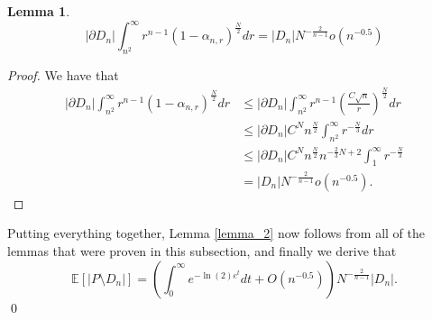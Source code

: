 \documentclass[10pt, twoside, leqno]{article}
\newtheorem{lemma}[thm]{Lemma}
\theoremstyle{definition}
\numberwithin{equation}{section}
\newcommand{\E}{{\mathbb{E}}}
\newcommand{\NN}{N^{-\frac 2{n-1} }}
\begin{document}
\begin{lemma}\label{3.9}
\[
|\partial D_{n}|\int_{n^{2}}^{\infty}r^{n-1}\left(1-\alpha_{n,r}\right)^{\frac{N}{2}}dr = |D_{n}|\NN o\left(n^{-0.5}\right)
\]
\end{lemma}
\begin{proof}
We have that
\begin{equation}
\begin{aligned}  |\partial D_{n}|\int_{n^{2}}^{\infty}r^{n-1}\left(1-\alpha_{n,r}\right)^{\frac{N}{2}}dr&\leq|\partial D_{n}|\int_{n^{2}}^{\infty}r^{n-1}\left(\frac{C\sqrt{n}}{r}\right)^{\frac{N}{2}}dr\\&\leq  |\partial D_{n}|C^{N}n^{\frac{N}{2}}\int_{n^{2}}^{\infty}r^{-\frac{N}{3}}dr\\&\leq|\partial D_{n}|C^{N}n^{\frac{N}{2}}n^{-\frac{2}{3}N+2}\int_{1}^{\infty}r^{-\frac{N}{3}}\\&=|D_{n}|\NN o\left(n^{-0.5}\right).
\end{aligned}
\end{equation}
\end{proof}
Putting everything together,  Lemma \ref{lemma_2} now follows from all of the lemmas that were proven in this subsection, and finally we derive that
\begin{equation}
\E[|P \setminus D_n|] = \left(\int_{0}^{\infty}e^{-\ln(2)e^{t}}dt+O\left(n^{-0.5}\right)\right)\NN|D_n|.
\end{equation}
\qed
\end{document}
